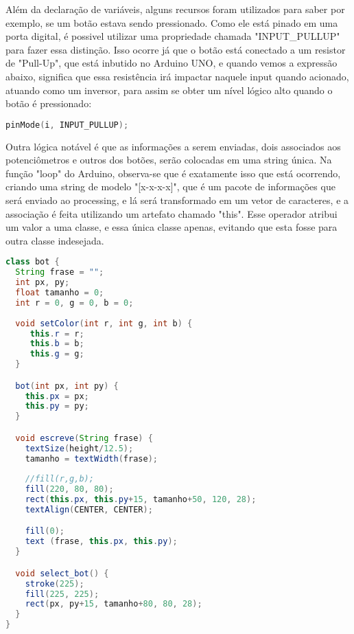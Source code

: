 	Além da declaração de variáveis, alguns recursos foram utilizados para saber por exemplo, se um botão estava sendo pressionado. Como ele está pinado em uma porta digital, é possivel utilizar uma propriedade chamada "INPUT\_PULLUP"	para fazer essa distinção. Isso ocorre já que o botão está conectado a um resistor de "Pull-Up", que está inbutido no Arduino UNO, e quando vemos a expressão abaixo, significa que essa resistência irá impactar naquele input quando acionado, atuando como um inversor, para assim se obter um nível lógico alto quando o botão é pressionado:

\begin{lstlisting}[language=C]
pinMode(i, INPUT_PULLUP);
\end{lstlisting}

	Outra lógica notável é que as informações a serem enviadas, dois associados aos potenciômetros e outros dos botões, serão colocadas em uma string única. Na função "loop" do Arduino, observa-se que é exatamente isso que está ocorrendo, criando uma string de modelo "[x-x-x-x]", que é um pacote de informações que será enviado ao processing, e lá será transformado em um vetor de caracteres, e a associação é feita utilizando um artefato chamado "this". Esse operador atribui um valor a uma classe, e essa única classe apenas, evitando que esta fosse para outra classe indesejada.

\begin{lstlisting}[language=Java]
class bot {
  String frase = "";
  int px, py;
  float tamanho = 0;
  int r = 0, g = 0, b = 0;
  
  void setColor(int r, int g, int b) {
     this.r = r;
     this.b = b;
     this.g = g;
  }

  bot(int px, int py) {
    this.px = px;
    this.py = py;
  }

  void escreve(String frase) {
    textSize(height/12.5);
    tamanho = textWidth(frase);
    
    //fill(r,g,b);
    fill(220, 80, 80);
    rect(this.px, this.py+15, tamanho+50, 120, 28);
    textAlign(CENTER, CENTER);

    fill(0);
    text (frase, this.px, this.py);
  }

  void select_bot() {
    stroke(225);
    fill(225, 225);
    rect(px, py+15, tamanho+80, 80, 28);
  }
}
\end{lstlisting}






